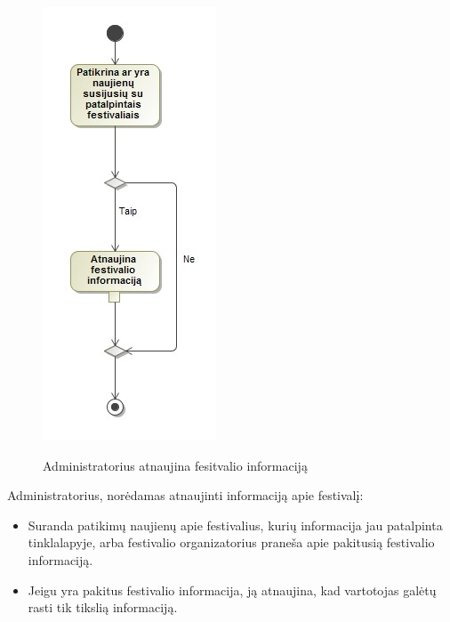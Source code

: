 \documentclass{VUMIFPSkursinis}
\begin{document}
\begin{figure}[H]
    \centering
    \includegraphics[scale=0.7]{img/geri/adminAtnaujinti}
    \label{img:uml14}
	\caption{Administratorius atnaujina fesitvalio informaciją}
\end{figure}

Administratorius, norėdamas atnaujinti informaciją apie festivalį:
\begin{itemize}
\item Suranda patikimų naujienų apie festivalius, kurių informacija jau patalpinta tinklalapyje, arba festivalio organizatorius praneša apie pakitusią festivalio informaciją.
\item Jeigu yra pakitus festivalio informacija, ją atnaujina, kad vartotojas galėtų rasti tik tikslią informaciją.  
\end{itemize}
\end{document}
